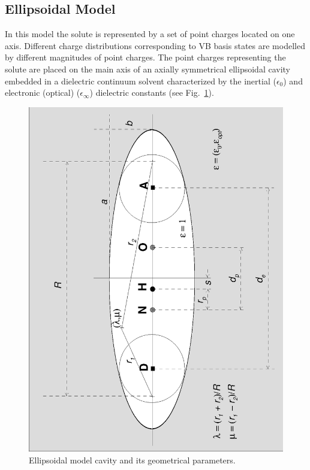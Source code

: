 \documentclass[oneside,11pt,openany]{book}
\begin{document}
\subsection{Ellipsoidal Model}
In this model the solute is represented by a set of point charges
located on one axis. Different charge distributions corresponding
to VB basis states are modelled by different magnitudes of point
charges. The point charges representing the solute are placed
on the main axis of an axially symmetrical ellipsoidal cavity
embedded in a dielectric continuum solvent characterized by the
inertial ($\epsilon_0$) and electronic (optical) ($\epsilon_\infty$)
dielectric constants (see Fig.~\ref{fig1}).
\begin{figure}[!bbb]
\begin{center}
\includegraphics[scale=0.65,angle=-90]{ellips.eps}
\end{center}
\caption{Ellipsoidal model cavity and its geometrical parameters.}
\label{fig1}
\end{figure}
\end{document}
